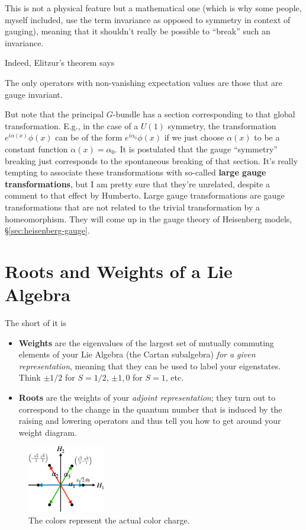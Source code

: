 \documentclass{report}
\begin{document}
This is not a physical feature but a mathematical one (which is why some people, 
myself included, use the term invariance as opposed to symmetry in context of 
gauging), meaning that it shouldn't really be possible to ``break'' such an 
invariance. 

Indeed, Elitzur's theorem says 
\begin{thinbluebox}
The only operators with non-vanishing expectation values are those that are 
gauge invariant.
\end{thinbluebox}
But note that the principal $ G $-bundle has a section corresponding to that 
global transformation. E.g., in the case of a $ U(1) $ symmetry, the 
transformation $ e^{i\alpha(x)} \phi(x)$ can be of the form $ e^{i\alpha_0}\phi(x) $ if we 
just choose $ \alpha(x) $ to be a constant function $ \alpha(x) = \alpha_0 $. 
It is postulated that the gauge ``symmetry'' breaking just corresponds to the 
spontaneous breaking of that section. It's really tempting to associate these 
transformations with so-called \textbf{large gauge transformations}, but I am 
pretty sure that they're unrelated, despite a comment to that effect by 
Humberto. Large gauge transformations are gauge transformations that are not
related to the trivial transformation by a homeomorphism. They will come 
up in the gauge theory of Heisenberg models, \S \ref{sec:heisenberg-gauge}.

\section{Roots and Weights of a Lie Algebra}

The short of it is
\begin{itemize}
\item \textbf{Weights} are the eigenvalues of the largest set of mutually commuting 
	elements of your Lie Algebra (the Cartan subalgebra) \textit{for a given
	representation}, meaning that they can be used to label your eigenstates. 
	Think $ \pm 1/2 $ for $ S=1/2 $, $ \pm1, 0 $ for $ S=1 $, etc.
\item \textbf{Roots} are the weights of your \textit{adjoint representation}; 
	they turn out to correspond to the change in the quantum number that is 
	induced by the raising and lowering operators and thus tell you how to get 
	around your weight diagram. 
\end{itemize}

\begin{figure}
	\begin{center}
		\includegraphics[width=0.3\textwidth]{figs/october/Roots-of-su3-where-a-1-a-2-are-simple-roots.png}
		\caption{The colors represent the actual color charge.}
		\label{fig:roots}
	\end{center}
	\vspace*{-3em}
\end{figure}
\end{document}
